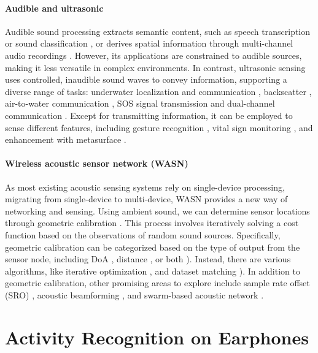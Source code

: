 \paragraph{Audible and ultrasonic}
Audible sound processing extracts semantic content, such as speech transcription \cite{gao2023funasr} or sound classification \cite{gemmeke2017audio}, or derives spatial information through multi-channel audio recordings \cite{wang2019doa}. However, its applications are constrained to audible sources, making it less versatile in complex environments. In contrast, ultrasonic sensing uses controlled, inaudible sound waves to convey information, supporting a diverse range of tasks: underwater localization and communication \cite{chen2022underwater, chen2023underwater}, backscatter \cite{jang2019underwater}, air-to-water communication \cite{tonolini2018networking}, SOS signal transmission \cite{yang2023aquahelper} and dual-channel communication \cite{qian2021aircode}. Except for transmitting information, it can be employed to sense different features, including gesture recognition \cite{wang2020push}, vital sign monitoring \cite{wang2022loear}, and enhancement with metasurface \cite{zhang2023acoustic}.

\paragraph{Wireless acoustic sensor network (WASN)}
As most existing acoustic sensing systems rely on single-device processing, migrating from single-device to multi-device, WASN provides a new way of networking and sensing.
Using ambient sound, we can determine sensor locations through geometric calibration \cite{gburrek2021geometry}. This process involves iteratively solving a cost function based on the observations of random sound sources. Specifically, geometric calibration can be categorized based on the type of output from the sensor node, including DoA \cite{wang2019doa}, distance \cite{gburrek2021iterative}, or both \cite{gburrek2021geometry}). Instead, there are various algorithms, like iterative optimization \cite{wang2019doa, fischler1981random}, and dataset matching \cite{gburrek2021geometry, hennecke2009hierarchical}).
In addition to geometric calibration, other promising areas to explore include sample rate offset (SRO) \cite{gburrek2022synchronization}, acoustic beamforming \cite{gburrek2023integration}, and swarm-based acoustic network \cite{itani2023creating}.



\section{Activity Recognition on Earphones}

